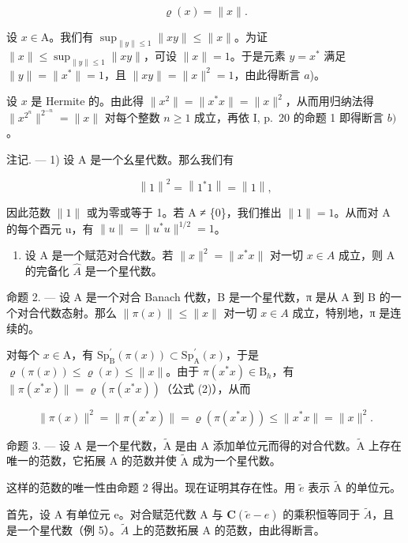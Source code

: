 \[
\varrho (x) = \| x \|.\tag{2}
\]

设 \(x \in \mathrm{A}\)。我们有 \(\sup_{\| y \| \leqslant 1} \| xy \| \leqslant \| x \|\)。为证 \(\| x \| \leqslant \sup_{\| y \| \leqslant 1} \| xy \|\)，可设 \(\| x \| = 1\)。于是元素 \(y = x^*\) 满足 \(\| y \| = \| x^* \| = 1\)，且 \(\| xy \| = \| x \|^2 = 1\)，由此得断言 \(a\))。

设 \(x\) 是 Hermite 的。由此得 \(\| x^2 \| = \| x^* x \| = \| x \|^2\)，从而用归纳法得 \(\| x^{2^n} \|^{2^{-n}} = \| x \|\) 对每个整数 \(n \geqslant 1\) 成立，再依 I, p.~20 的命题 1 即得断言 \(b)\)。

注记. --- 1) 设 A 是一个幺星代数。那么我们有

\[
\left\| 1 \right\| ^ {2} = \left\| 1 ^ {*} 1 \right\| = \left\| 1 \right\|,
\]

因此范数 \(\|1\|\) 或为零或等于 1。若 A ≠ \{0\}，我们推出 \(\|1\| = 1\)。从而对 A 的每个酉元 u，有 \(\|u\| = \|u^{*}u\|^{1/2} = 1\)。

\begin{enumerate}
\def\labelenumi{\arabic{enumi})}
\setcounter{enumi}{1}
\tightlist
\item
  设 A 是一个赋范对合代数。若 \(\|x\|^{2}=\|x^{*}x\|\) 对一切 \(x\in A\) 成立，则 A 的完备化 \(\widehat{A}\) 是一个星代数。
\end{enumerate}

命题 2. --- 设 A 是一个对合 Banach 代数，B 是一个星代数，π 是从 A 到 B 的一个对合代数态射。那么 \(\|\pi(x)\| \leqslant \|x\|\) 对一切 \(x \in A\) 成立，特别地，π 是连续的。

对每个 \(x \in \mathrm{A}\)，有 \(\mathrm{Sp}_{\mathrm{B}}^{\prime}(\pi(x)) \subset \mathrm{Sp}_{\mathrm{A}}^{\prime}(x)\)，于是 \(\varrho(\pi(x)) \leqslant \varrho(x) \leqslant \|x\|\)。由于 \(\pi(x^{*}x) \in \mathrm{B}_{h}\)，有 \(\|\pi(x^{*}x)\| = \varrho(\pi(x^{*}x))\)（公式 (2)），从而

\[
\| \pi (x) \| ^ {2} = \| \pi (x ^ {*} x) \| = \varrho (\pi (x ^ {*} x)) \leqslant \| x ^ {*} x \| = \| x \| ^ {2}.
\]

命题 3. --- 设 A 是一个星代数，\(\widetilde{\mathrm{A}}\) 是由 A 添加单位元而得的对合代数。\(\widetilde{\mathrm{A}}\) 上存在唯一的范数，它拓展 A 的范数并使 \(\widetilde{\mathrm{A}}\) 成为一个星代数。

这样的范数的唯一性由命题 2 得出。现在证明其存在性。用 \(\widetilde{e}\) 表示 \(\widetilde{\mathrm{A}}\) 的单位元。

首先，设 A 有单位元 e。对合赋范代数 A 与 \(\mathbf{C}(\widetilde{e}-e)\) 的乘积恒等同于 \(\widetilde{A}\)，且是一个星代数（例 5）。\(\widetilde{A}\) 上的范数拓展 A 的范数，由此得断言。

